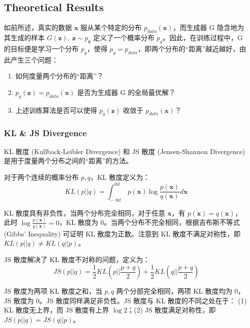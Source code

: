 \documentclass{myarticle}
\begin{document}
    \subsection{Theoretical Results}
    
    如前所述，真实的数据 $\bm{x}$ 服从某个特定的分布 $p_{data}(\bm{x})$，而生成器 G 隐含地为其生成的样本 $G(\bm{z}),\ \bm{z}\sim p_{\bm{z}}$ 定义了一个概率分布 $p_g$。因此，在训练过程中，G 的目标便是学习一个分布 $p_g$，使得 $p_g=p_{data}$，即两个分布的“距离”越近越好，由此产生三个问题：
    \begin{enumerate}
        \item 如何度量两个分布的“距离”？
        \item $p_g(\bm{z})=p_{data}(\bm{x})$ 是否为生成器 G 的全局最优解？
        \item 上述训练算法是否可以使得 $p_g(\bm{z})$ 收敛于 $p_{data}(\bm{x})$？
    \end{enumerate}

    \subsubsection{KL \& JS Divergence}

    KL 散度 (Kullback-Leibler Divergence) 和 JS 散度 (Jensen-Shannon Divergence) 是用于度量两个分布之间的“距离”的方法。

    对于两个连续的概率分布 $p,q$，KL 散度定义为：
    \begin{equation}
        KL(p||q)=\int_{-\inf}^{\inf} p(\bm{x})\log\frac{p(\bm{x})}{q(\bm{x})}d\bm{x}
    \end{equation}

    KL 散度具有非负性，当两个分布完全相同，对于任意 $\bm{x}$，有 $p(\bm{x})=q(\bm{x})$，此时 $\log\frac{p(\bm{x})}{q(\bm{x})}=0$，KL 散度为 0。当两个分布不完全相同，根据吉布斯不等式 (Gibbs' Inequality) 可证明 KL 散度为正数。注意到 KL 散度不满足对称性，即 $KL(p||q)\neq KL(q||p)$。

    JS 散度解决了 KL 散度不对称的问题，定义为：
    \begin{equation}
        JS(p||q)=\frac{1}{2}KL(p||\frac{p+q}{2})+\frac{1}{2}KL(q||\frac{p+q}{2})
    \end{equation}

    JS 散度为两项 KL 散度之和，当 $p,q$ 两个分部完全相同，两项 KL 散度均为 0，JS 散度为 0。JS 散度同样满足非负性。JS 散度与 KL 散度的不同之处在于： (1) KL 散度无上界，而 JS 散度有上界 $\log2$；(2) JS 散度满足对称性，即 $JS(p||q)=JS(q||p)$。
\end{document}
